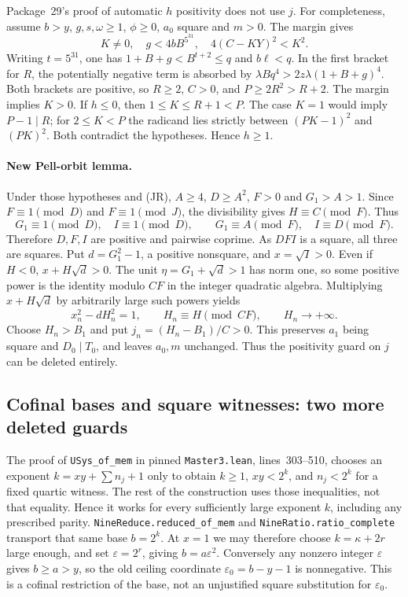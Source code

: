 Package~29's proof of automatic $h$ positivity does not use $j$.
For completeness, assume $b>y$, $g,s,\omega\ge1$, $\phi\ge0$,
$a_0$ square and $m>0$. The margin gives
\[
 K\ne0,\quad g<4bB^{5^{31}},\quad 4(C-KY)^2<K^2.
\]
Writing $t=5^{31}$, one has $1+B+g<B^{t+2}\le q$ and
$b\ell<q$. In the first bracket for $R$, the potentially negative
term is absorbed by $\lambda Bq^4>2z\lambda(1+B+g)^4$.
Both brackets are positive, so $R\ge2$, $C>0$, and
$P\ge2R^2>R+2$. The margin implies $K>0$. If $h\le0$, then
$1\le K\le R+1<P$. The case $K=1$ would imply $P-1\mid R$;
for $2\le K<P$ the radicand lies strictly between $(PK-1)^2$ and
$(PK)^2$. Both contradict the hypotheses. Hence $h\ge1$.

\paragraph{New Pell-orbit lemma.}
Under those hypotheses and (JR), $A\ge4$, $D\ge A^2$, $F>0$ and
$G_1>A>1$. Since $F\equiv1\pmod D$ and $F\equiv1\pmod J$,
the divisibility gives $H\equiv C\pmod F$. Thus
\[
 G_1\equiv1\pmod D,\quad I\equiv1\pmod D,
 \qquad G_1\equiv A\pmod F,\quad I\equiv D\pmod F.
\]
Therefore $D,F,I$ are positive and pairwise coprime. As $DFI$ is a
square, all three are squares. Put $d=G_1^2-1$, a positive nonsquare,
and $x=\sqrt I>0$. Even if $H<0$, $x+H\sqrt d>0$.
The unit $\eta=G_1+\sqrt d>1$ has norm one, so some positive power
is the identity modulo $CF$ in the integer quadratic algebra.
Multiplying $x+H\sqrt d$ by arbitrarily large such powers yields
\[
 x_n^2-dH_n^2=1,\qquad H_n\equiv H\pmod{CF},\qquad H_n\longrightarrow+\infty.
\]
Choose $H_n>B_1$ and put $j_n=(H_n-B_1)/C>0$. This preserves
$a_1$ being square and $D_0\mid T_0$, and leaves $a_0,m$ unchanged.
Thus the positivity guard on $j$ can be deleted entirely.

\subsection{Cofinal bases and square witnesses: two more deleted guards}
The proof of \texttt{USys\_of\_mem} in pinned
\texttt{Master3.lean}, lines~303--510, chooses an exponent
$k=xy+\sum n_j+1$ only to obtain $k\ge1$, $xy<2^k$, and
$n_j<2^k$ for a fixed quartic witness. The rest of the construction
uses those inequalities, not that equality. Hence it works for every
sufficiently large exponent $k$, including any prescribed parity.
\texttt{NineReduce.reduced\_of\_mem} and
\texttt{NineRatio.ratio\_complete} transport that same base $b=2^k$.
At $x=1$ we may therefore choose $k=\kappa+2r$ large enough, and set
$\varepsilon=2^r$, giving $b=a\varepsilon^2$. Conversely any
nonzero integer $\varepsilon$ gives $b\ge a>y$, so the old ceiling
coordinate $\varepsilon_0=b-y-1$ is nonnegative. This is a cofinal
restriction of the base, not an unjustified square substitution for
$\varepsilon_0$.

